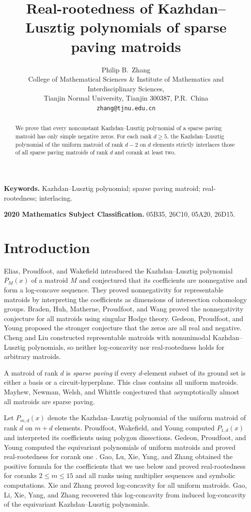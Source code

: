 \documentclass[11pt]{article}
\title{Real-rootedness of Kazhdan--Lusztig polynomials of sparse paving matroids}
\author{Philip B.~Zhang\\[0.4em]
\small College of Mathematical Sciences \& Institute of Mathematics and Interdisciplinary Sciences,\\
\small Tianjin Normal University, Tianjin 300387, P.R.~China\\[0.2em]
\small\texttt{zhang@tjnu.edu.cn}}
\date{}
\numberwithin{equation}{section}
\theoremstyle{remark}\newtheorem{remark}[theorem]{Remark}
\begin{document}
\maketitle
\begin{abstract}
We prove that every nonconstant Kazhdan--Lusztig polynomial of a sparse
paving matroid has only simple negative zeros. For each rank $d\ge5$,
the Kazhdan--Lusztig polynomial of the uniform matroid of rank $d-2$
on $d$ elements strictly interlaces those of all sparse paving matroids
of rank $d$ and corank at least two.
\end{abstract}

\noindent\textbf{Keywords.} Kazhdan--Lusztig polynomial; sparse paving matroid;
real-rootedness; interlacing.

\noindent\textbf{2020 Mathematics Subject Classification.}
05B35, 26C10, 05A20, 26D15.

\section{Introduction}

Elias, Proudfoot, and Wakefield \cite{EPW} introduced the
Kazhdan--Lusztig polynomial $P_M(x)$ of a matroid $M$ and conjectured
that its coefficients are nonnegative and form a log-concave sequence.
They proved nonnegativity for representable matroids by interpreting the coefficients
as dimensions of intersection cohomology groups. Braden, Huh, Matherne, Proudfoot,
and Wang \cite{BHMPW} proved the nonnegativity conjecture for all matroids
using singular Hodge theory. Gedeon, Proudfoot, and Young
\cite{GPY} proposed the stronger conjecture that the
zeros are all real and negative. Cheng and Liu \cite{CL} constructed
representable matroids with nonunimodal Kazhdan--Lusztig polynomials,
so neither log-concavity nor real-rootedness holds for arbitrary
matroids.

A matroid of rank $d$ is \emph{sparse paving} if every $d$-element
subset of its ground set is either a basis or a circuit-hyperplane.
This class contains all uniform matroids. Mayhew, Newman, Welsh, and
Whittle \cite{MNWW} conjectured that asymptotically almost all matroids
are sparse paving.

Let $P_{m,d}(x)$ denote the
Kazhdan--Lusztig polynomial of the uniform matroid of rank $d$ on
$m+d$ elements. Proudfoot, Wakefield, and Young
\cite{PWY} computed $P_{1,d}(x)$ and interpreted its coefficients
using polygon dissections. Gedeon, Proudfoot, and Young
computed the equivariant polynomials of uniform matroids \cite{GPYeq}
and proved real-rootedness for corank one \cite[Theorem~3.3]{GPY}.
Gao, Lu, Xie, Yang, and
Zhang \cite{GLXYZ} obtained the positive formula for the coefficients that we use
below and proved real-rootedness for coranks $2\le m\le15$ and all
ranks using multiplier sequences and symbolic computations. Xie and Zhang \cite{XZ} proved
log-concavity for all uniform matroids. Gao, Li, Xie, Yang, and Zhang
\cite{GLiXYZ} recovered this log-concavity from induced log-concavity of
the equivariant Kazhdan--Lusztig polynomials.
\end{document}
